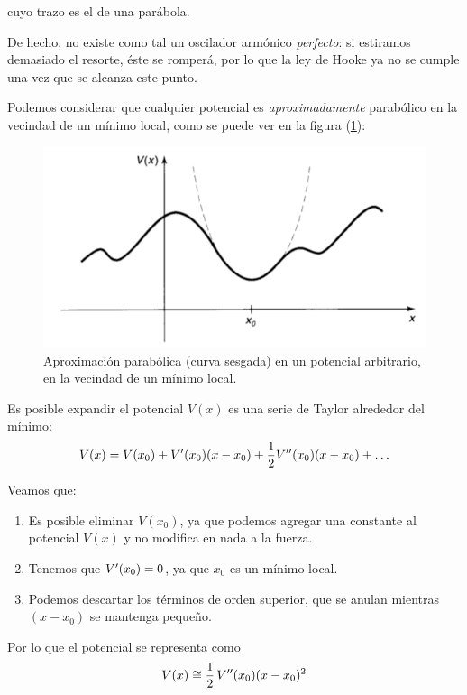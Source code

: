 cuyo trazo es el de una parábola.
\par
De hecho, no existe como tal un oscilador armónico \emph{perfecto}: si estiramos demasiado el resorte, éste se romperá, por lo que la ley de Hooke ya no se cumple una vez que se alcanza este punto.
\par
Podemos considerar que cualquier potencial es \textit{aproximadamente} parabólico en la vecindad de un mínimo local, como se puede ver en la figura (\ref{fig:figura_001}):
\begin{figure}[H]
    \centering
    \includegraphics[scale=0.5]{Imagenes/Potencial_arbitrario.png}
    \caption{Aproximación parabólica (curva sesgada) en un potencial arbitrario, en la vecindad de un mínimo local.}
    \label{fig:figura_001}
\end{figure}

Es posible expandir el potencial $V(x)$ es una serie de Taylor alrededor del mínimo:
\begin{align*}
V(x) = V(x_{0}) + {V}^{\prime} (x_{0}) (x - x_{0}) + \dfrac{1}{2} {V}^{\prime \prime} (x_{0}) (x - x_{0}) + \ldots
\end{align*}

Veamos que:
\begin{enumerate}
\item Es posible eliminar $V(x_{0})$, ya que podemos agregar una constante al potencial $V(x)$ y no modifica en nada a la fuerza.
\item Tenemos que ${V}^{\prime}(x_{0}) = 0$, ya que $x_{0}$ es un mínimo local.
\item Podemos descartar los términos de orden superior, que se anulan mientras $(x - x_{0})$ se mantenga pequeño.
\end{enumerate}

Por lo que el potencial se representa como
\begin{align*}
V(x) \cong \dfrac{1}{2} \, {V}^{\prime \prime} (x_{0}) (x - x_{0})^{2}
\end{align*}

